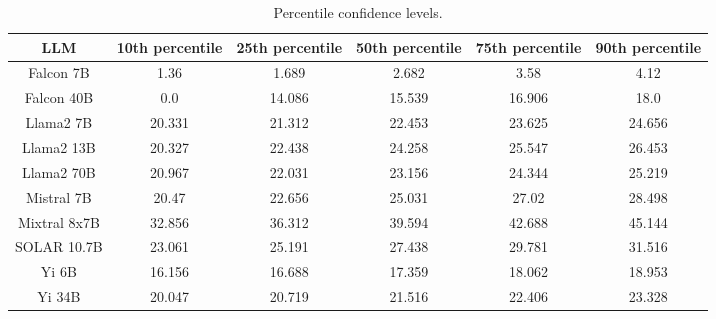 \begin{table*}
\centering
\begin{tabular}{c|c|c|c|c|c}
LLM & 10th percentile & 25th percentile & 50th percentile & 75th percentile & 90th percentile\\ \hline
Falcon 7B & 1.36 & 1.689 & 2.682 & 3.58 & 4.12\\
Falcon 40B & 0.0 & 14.086 & 15.539 & 16.906 & 18.0\\
Llama2 7B & 20.331 & 21.312 & 22.453 & 23.625 & 24.656\\
Llama2 13B & 20.327 & 22.438 & 24.258 & 25.547 & 26.453\\
Llama2 70B & 20.967 & 22.031 & 23.156 & 24.344 & 25.219\\
Mistral 7B & 20.47 & 22.656 & 25.031 & 27.02 & 28.498\\
Mixtral 8x7B & 32.856 & 36.312 & 39.594 & 42.688 & 45.144\\
SOLAR 10.7B & 23.061 & 25.191 & 27.438 & 29.781 & 31.516\\
Yi 6B & 16.156 & 16.688 & 17.359 & 18.062 & 18.953\\
Yi 34B & 20.047 & 20.719 & 21.516 & 22.406 & 23.328\\
\hline
\end{tabular}
\caption{Percentile confidence levels.}
\label{tab:percentile_conf}
\end{table*}

